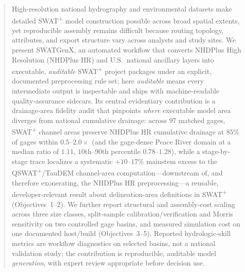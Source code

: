 \begin{abstract}
High-resolution national hydrography and environmental datasets make detailed SWAT\textsuperscript{+} model construction possible across broad spatial extents, yet reproducible assembly remains difficult because routing topology, attributes, and export structure vary across analysts and study sites.
We present SWATGenX, an automated workflow that converts NHDPlus High Resolution (NHDPlus HR) and U.S.\ national ancillary layers into executable, \emph{auditable} SWAT\textsuperscript{+} project packages under an explicit, documented preprocessing rule set; here \emph{auditable} means every intermediate output is inspectable and ships with machine-readable quality-assurance sidecars.
Its central evidentiary contribution is a drainage-area fidelity audit that pinpoints \emph{where} executable model area diverges from national cumulative drainage: across 97 matched gages, SWAT\textsuperscript{+} channel areas preserve NHDPlus HR cumulative drainage at 85\% of gages within $0.5$--$2.0\times$ (and the gage-dense Peace River domain at a median ratio of $1.11$, $10$th--$90$th percentile $0.78$--$1.28$), while a stage-by-stage trace localizes a systematic $+10$--$17\%$ mainstem excess to the QSWAT\textsuperscript{+}/TauDEM channel-area computation---downstream of, and therefore exonerating, the NHDPlus HR preprocessing---a reusable, developer-relevant result about delineation-area definitions in SWAT\textsuperscript{+} (Objectives~1--2).
We further report structural and assembly-cost scaling across three size classes, split-sample calibration/verification and Morris sensitivity on two controlled gage basins, and measured simulation cost on one documented host/build (Objectives~3--5).
Reported hydrologic-skill metrics are workflow diagnostics on selected basins, not a national validation study; the contribution is reproducible, auditable model \emph{generation}, with expert review appropriate before decision use.
\end{abstract}
